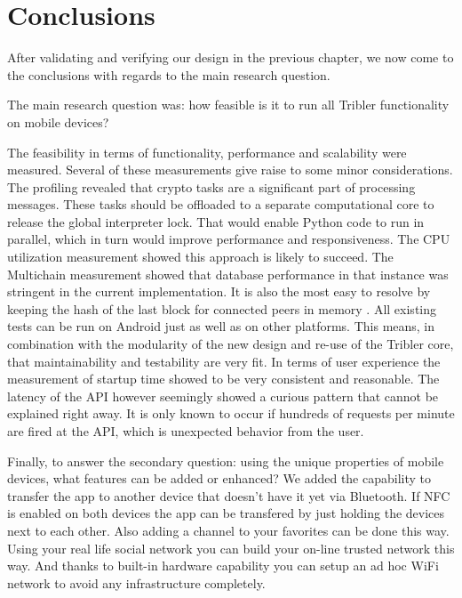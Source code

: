 \chapter{Conclusions}
After validating and verifying our design in the previous chapter, we now come to the conclusions with regards to the main research question.

The main research question was: how feasible is it to run all Tribler functionality on mobile devices? %

The feasibility in terms of functionality, performance and scalability were measured.
Several of these measurements give raise to some minor considerations.
The profiling revealed that crypto tasks are a significant part of processing messages.
These tasks should be offloaded to a separate computational core to release the global interpreter lock.
That would enable Python code to run in parallel, which in turn would improve performance and responsiveness.
The CPU utilization measurement showed this approach is likely to succeed.
The Multichain measurement showed that database performance in that instance was stringent in the current implementation.
It is also the most easy to resolve by keeping the hash of the last block for connected peers in memory .
All existing tests can be run on Android just as well as on other platforms.
This means, in combination with the modularity of the new design and re-use of the Tribler core, that maintainability and testability are very fit.
In terms of user experience the measurement of startup time showed to be very consistent and reasonable.
The latency of the API however seemingly showed a curious pattern that cannot be explained right away.
It is only known to occur if hundreds of requests per minute are fired at the API, which is unexpected behavior from the user.

Finally, to answer the secondary question: using the unique properties of mobile devices, what features can be added or enhanced?
We added the capability to transfer the app to another device that doesn't have it yet via Bluetooth.
If NFC is enabled on both devices the app can be transfered by just holding the devices next to each other.
Also adding a channel to your favorites can be done this way.
Using your real life social network you can build your on-line trusted network this way.
And thanks to built-in hardware capability you can setup an ad hoc WiFi network to avoid any infrastructure completely.

